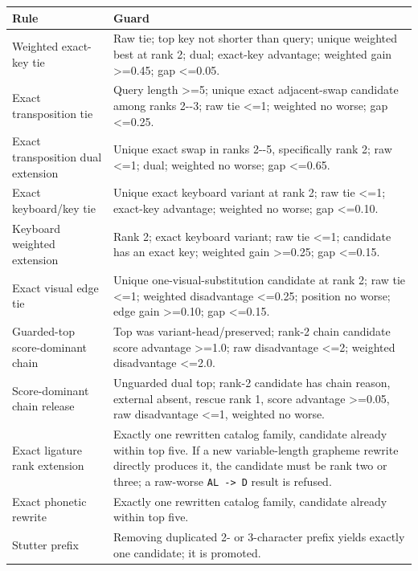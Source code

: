 {\def\LTcaptype{none} %
\begin{longtable}[]{@{}>{\RaggedRight\arraybackslash}p{.27\linewidth}>{\RaggedRight\arraybackslash}p{.66\linewidth}@{}}
\toprule\noalign{}
Rule & Guard \\
\midrule\noalign{}
\endhead
\bottomrule\noalign{}
\endlastfoot
Weighted exact-key tie & Raw tie; top key not shorter than query; unique weighted best at rank 2; dual; exact-key advantage; weighted gain \textgreater=0.45; gap \textless=0.05. \\
Exact transposition tie & Query length \textgreater=5; unique exact adjacent-swap candidate among ranks 2-\/-3; raw tie \textless=1; weighted no worse; gap \textless=0.25. \\
Exact transposition dual extension & Unique exact swap in ranks 2-\/-5, specifically rank 2; raw \textless=1; dual; weighted no worse; gap \textless=0.65. \\
Exact keyboard/key tie & Unique exact keyboard variant at rank 2; raw tie \textless=1; exact-key advantage; weighted no worse; gap \textless=0.10. \\
Keyboard weighted extension & Rank 2; exact keyboard variant; raw tie \textless=1; candidate has an exact key; weighted gain \textgreater=0.25; gap \textless=0.15. \\
Exact visual edge tie & Unique one-visual-substitution candidate at rank 2; raw tie \textless=1; weighted disadvantage \textless=0.25; position no worse; edge gain \textgreater=0.10; gap \textless=0.15. \\
Guarded-top score-dominant chain & Top was variant-head/preserved; rank-2 chain candidate score advantage \textgreater=1.0; raw disadvantage \textless=2; weighted disadvantage \textless=2.0. \\
Score-dominant chain release & Unguarded dual top; rank-2 candidate has chain reason, external absent, rescue rank 1, score advantage \textgreater=0.05, raw disadvantage \textless=1, weighted no worse. \\
Exact ligature rank extension & Exactly one rewritten catalog family, candidate already within top five. If a new variable-length grapheme rewrite directly produces it, the candidate must be rank two or three; a raw-worse \texttt{AL\ -\textgreater{}\ D} result is refused. \\
Exact phonetic rewrite & Exactly one rewritten catalog family, candidate already within top five. \\
Stutter prefix & Removing duplicated 2- or 3-character prefix yields exactly one candidate; it is promoted. \\
\end{longtable}
}

